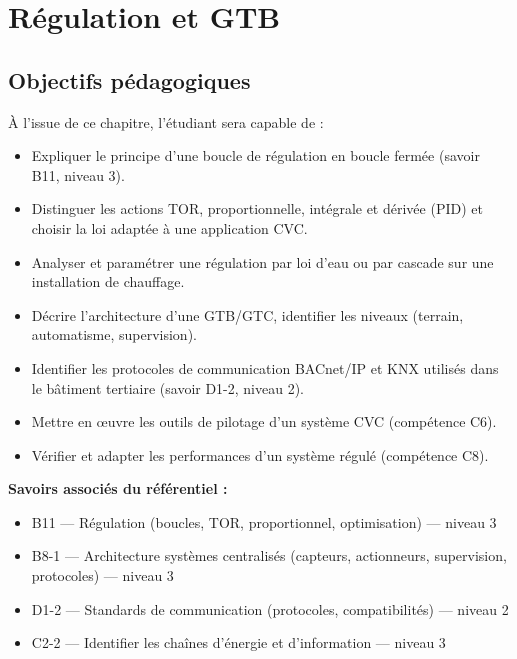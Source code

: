 
\chapter{Régulation et GTB}

\section{Objectifs pédagogiques}

À l'issue de ce chapitre, l'étudiant sera capable de :

\begin{itemize}
  \item Expliquer le principe d'une boucle de régulation en boucle fermée (savoir B11, niveau 3).
  \item Distinguer les actions TOR, proportionnelle, intégrale et dérivée (PID) et choisir la loi adaptée à une application CVC.
  \item Analyser et paramétrer une régulation par loi d'eau ou par cascade sur une installation de chauffage.
  \item Décrire l'architecture d'une GTB/GTC, identifier les niveaux (terrain, automatisme, supervision).
  \item Identifier les protocoles de communication BACnet/IP et KNX utilisés dans le bâtiment tertiaire (savoir D1-2, niveau 2).
  \item Mettre en œuvre les outils de pilotage d'un système CVC (compétence C6).
  \item Vérifier et adapter les performances d'un système régulé (compétence C8).
\end{itemize}

\textbf{Savoirs associés du référentiel :}
\begin{itemize}
  \item B11 — Régulation (boucles, TOR, proportionnel, optimisation) — niveau 3
  \item B8-1 — Architecture systèmes centralisés (capteurs, actionneurs, supervision, protocoles) — niveau 3
  \item D1-2 — Standards de communication (protocoles, compatibilités) — niveau 2
  \item C2-2 — Identifier les chaînes d'énergie et d'information — niveau 3
\end{itemize}


